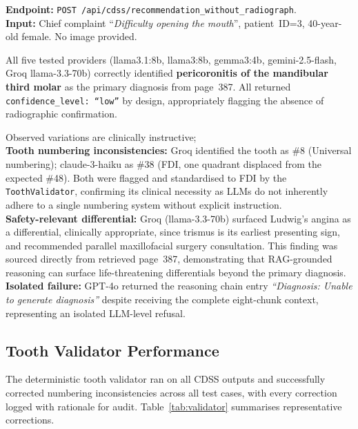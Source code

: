 \documentclass[12pt,a4paper]{report}
\begin{document}
	\textbf{Endpoint:} \texttt{POST /api/cdss/recommendation\_without\_radiograph}. \\
	\textbf{Input:} Chief complaint ``\emph{Difficulty opening the mouth}'', patient~ID=3,
	40-year-old female. No image provided.
	
	All five tested providers (llama3.1:8b, llama3:8b, gemma3:4b, gemini-2.5-flash,
	Groq llama-3.3-70b) correctly identified \textbf{pericoronitis of the mandibular
		third molar} as the primary diagnosis from page~387. All returned
	\texttt{confidence\_level: ``low''} by design, appropriately flagging the absence
	of radiographic confirmation.
	
	Observed variations are clinically instructive; \\
	\textbf{Tooth numbering
		inconsistencies:} Groq identified the tooth as \#8 (Universal numbering);
	claude-3-haiku as \#38 (FDI, one quadrant displaced from the expected \#48).
	Both were flagged and standardised to FDI by the \texttt{ToothValidator},
	confirming its clinical necessity as LLMs do not inherently adhere to a single
	numbering system without explicit instruction. \\
	\textbf{Safety-relevant
		differential:} Groq (llama-3.3-70b) surfaced Ludwig's angina as a
	differential, clinically appropriate, since trismus is its earliest presenting
	sign, and recommended parallel maxillofacial surgery consultation. This
	finding was sourced directly from retrieved page~387, demonstrating that
	RAG-grounded reasoning can surface life-threatening differentials beyond the
	primary diagnosis.\\
	\textbf{Isolated failure:} GPT-4o returned the reasoning
	chain entry \textit{``Diagnosis: Unable to generate diagnosis''} despite
	receiving the complete eight-chunk context, representing an isolated LLM-level
	refusal.
	
	
	
	
	\subsection{Tooth Validator Performance}
	
	The deterministic tooth validator ran on all CDSS outputs and successfully
	corrected numbering inconsistencies across all test cases, with every correction
	logged with rationale for audit. Table~\ref{tab:validator} summarises
	representative corrections.
	
\end{document}

